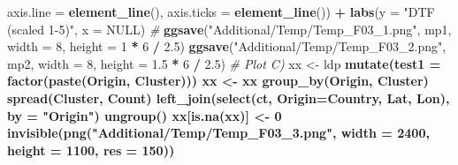 \documentclass[
]{article}
\newenvironment{Shaded}{\begin{snugshade}}{\end{snugshade}}
\newcommand{\CommentTok}[1]{\textcolor[rgb]{0.56,0.35,0.01}{\textit{#1}}}
\newcommand{\DataTypeTok}[1]{\textcolor[rgb]{0.13,0.29,0.53}{#1}}
\newcommand{\DecValTok}[1]{\textcolor[rgb]{0.00,0.00,0.81}{#1}}
\newcommand{\FloatTok}[1]{\textcolor[rgb]{0.00,0.00,0.81}{#1}}
\newcommand{\KeywordTok}[1]{\textcolor[rgb]{0.13,0.29,0.53}{\textbf{#1}}}
\newcommand{\NormalTok}[1]{#1}
\newcommand{\OperatorTok}[1]{\textcolor[rgb]{0.81,0.36,0.00}{\textbf{#1}}}
\newcommand{\OtherTok}[1]{\textcolor[rgb]{0.56,0.35,0.01}{#1}}
\newcommand{\StringTok}[1]{\textcolor[rgb]{0.31,0.60,0.02}{#1}}
\begin{document}
\begin{Shaded}
\begin{Highlighting}[]
{{{{{{{{{{{{{{{{{{{{{{        \DataTypeTok{axis.line =} \KeywordTok{element_line}\NormalTok{(), }\DataTypeTok{axis.ticks =} \KeywordTok{element_line}\NormalTok{()) }\OperatorTok{+}
\StringTok{  }\KeywordTok{labs}\NormalTok{(}\DataTypeTok{y =} \StringTok{"DTF (scaled 1-5)"}\NormalTok{, }\DataTypeTok{x =} \OtherTok{NULL}\NormalTok{)}
\CommentTok{#}
\KeywordTok{ggsave}\NormalTok{(}\StringTok{"Additional/Temp/Temp_F03_1.png"}\NormalTok{, mp1, }\DataTypeTok{width =} \DecValTok{8}\NormalTok{, }\DataTypeTok{height =}   \DecValTok{1} \OperatorTok{*}\StringTok{ }\DecValTok{6} \OperatorTok{/}\StringTok{ }\FloatTok{2.5}\NormalTok{)}
\KeywordTok{ggsave}\NormalTok{(}\StringTok{"Additional/Temp/Temp_F03_2.png"}\NormalTok{, mp2, }\DataTypeTok{width =} \DecValTok{8}\NormalTok{, }\DataTypeTok{height =} \FloatTok{1.5} \OperatorTok{*}\StringTok{ }\DecValTok{6} \OperatorTok{/}\StringTok{ }\FloatTok{2.5}\NormalTok{)}
\CommentTok{# Plot C)}
\NormalTok{xx <-}\StringTok{ }\NormalTok{ldp }\OperatorTok{%
\StringTok{  }\KeywordTok{mutate}\NormalTok{(}\DataTypeTok{test1 =} \KeywordTok{factor}\NormalTok{(}\KeywordTok{paste}\NormalTok{(Origin, Cluster)))}
\NormalTok{xx <-}\StringTok{ }\NormalTok{xx }\OperatorTok{%
\StringTok{  }\KeywordTok{group_by}\NormalTok{(Origin, Cluster) }\OperatorTok{%
\StringTok{  }\KeywordTok{spread}\NormalTok{(Cluster, Count) }\OperatorTok{%
\StringTok{  }\KeywordTok{left_join}\NormalTok{(}\KeywordTok{select}\NormalTok{(ct, }\DataTypeTok{Origin=}\NormalTok{Country, Lat, Lon), }\DataTypeTok{by =} \StringTok{"Origin"}\NormalTok{) }\OperatorTok{%
\StringTok{  }\KeywordTok{ungroup}\NormalTok{() }\OperatorTok{%
\NormalTok{xx[}\KeywordTok{is.na}\NormalTok{(xx)] <-}\StringTok{ }\DecValTok{0} 
\KeywordTok{invisible}\NormalTok{(}\KeywordTok{png}\NormalTok{(}\StringTok{"Additional/Temp/Temp_F03_3.png"}\NormalTok{, }\DataTypeTok{width =} \DecValTok{2400}\NormalTok{, }\DataTypeTok{height =} \DecValTok{1100}\NormalTok{, }\DataTypeTok{res =} \DecValTok{150}\NormalTok{))}
}}}}}}}}}}}}}}}}}}}}}}}}}}}}
\end{Highlighting}
\end{Shaded}
\end{document}
